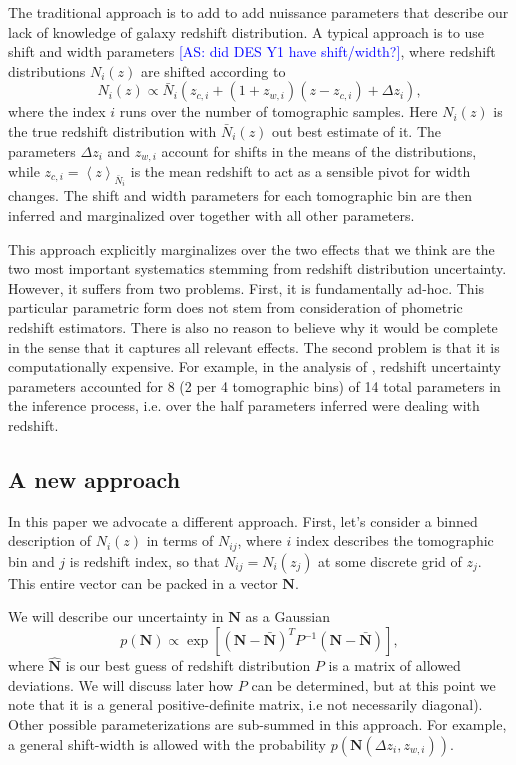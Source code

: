 \documentclass[a4paper,11pt]{article}
\newcommand{\as}[1]{{\textcolor{blue}{[AS: #1]}}}
\newcommand{\vN}{\mathbf{N}}
\begin{document}
The traditional approach is to add to add nuissance parameters that describe our lack of knowledge of galaxy redshift distribution. A typical approach is to use shift and width parameters  \cite{1706.09359,1912.08209} \as{did DES Y1 have shift/width?},
where redshift distributions $N_i(z)$ are shifted according to
    \begin{equation}
      N_{i}(z) \propto \bar{N}_{i}\left(z_{c,i} + (1 + z_{w, i})(z-z_{c, i}) + \Delta z_{i}\right),
      \label{eq:photo-z-model}
    \end{equation} 
where the index $i$ runs over the number of tomographic samples. Here $N_{i}(z)$ is the true redshift distribution with  $\bar{N}_{i}(z)$ out best estimate of it. The parameters $\Delta z_{i}$ and $z_{w,i}$ account for shifts in the means of the distributions, while $z_{c,i} = \left<z\right>_{\bar{N}_i}$ is the mean redshift to act as a sensible pivot for width changes. The shift and width parameters for each tomographic bin are then inferred and marginalized over together with all other parameters.
    
This approach explicitly marginalizes over the two effects that we think are the two most important systematics stemming from redshift distribution uncertainty. However, it suffers from two problems. First, it is fundamentally ad-hoc. This particular parametric form does not stem from consideration of phometric redshift estimators. There is also no reason to believe why it would be complete in the sense that it captures all relevant effects. The second problem is that it is computationally expensive. For example, in the analysis 
    of \cite{1912.08209}, redshift uncertainty parameters accounted for 8 (2 per 4 tomographic bins) of 14 total parameters in the inference process, i.e. over the half parameters inferred were dealing with redshift.

\subsection{A new approach}
    
In this paper we advocate a different approach. First, let's consider a binned description of $N_i(z)$ in terms of $N_{ij}$, where $i$ index describes the tomographic bin and $j$ is redshift index, so that $N_{ij} = N_i(z_j)$ at some discrete grid of $z_j$. This entire vector can be packed in a vector $\vN$.

We will describe our uncertainty in $\vN$ as a Gaussian
\begin{equation}
  p(\vN) \propto \exp\left[  (\vN - \bar{\vN})^T P^{-1} (\vN -\bar{\vN}) \right],
\end{equation}
where $\hat{\vN}$ is our best guess of redshift distribution $P$ is a matrix of allowed deviations. We will discuss later how $P$ can be determined, but at this point we note that it is a general positive-definite matrix, i.e not necessarily diagonal). Other possible parameterizations are sub-summed in this approach. For example, a general shift-width is allowed with the probability $p(\vN(\Delta z_i, z_{w,i}))$.
\end{document}
